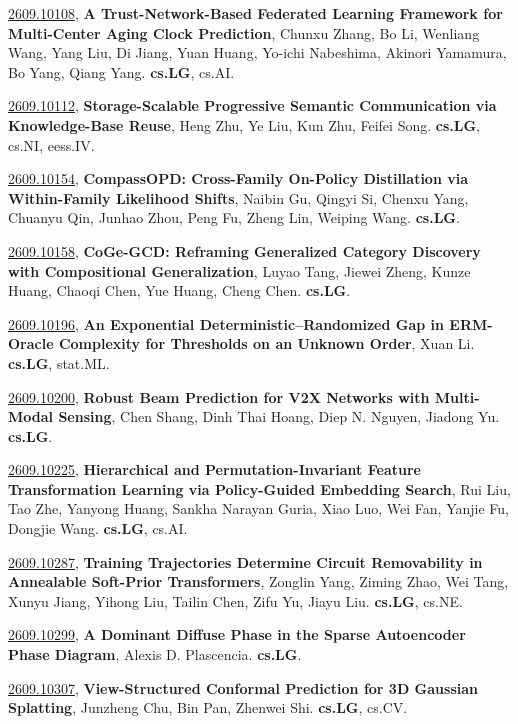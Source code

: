 \documentclass[9pt, a4paper]{article}
\theoremstyle{plain}
\theoremstyle{definition}
\theoremstyle{remark}
\newcommand{\arxivwithtarget}[3]{\hypertarget{#1}{}\href{https://arxiv.org/abs/#1}{#1}, \textbf{\textcolor{arxivblue}{#2}}, #3. }
\begin{document}
\arxivwithtarget{2609.10108}{A Trust-Network-Based Federated Learning Framework for Multi-Center Aging Clock Prediction}{Chunxu Zhang, Bo Li, Wenliang Wang, Yang Liu, Di Jiang, Yuan Huang, Yo-ichi Nabeshima, Akinori Yamamura, Bo Yang, Qiang Yang}\textbf{cs.LG}, cs.AI.



\arxivwithtarget{2609.10112}{Storage-Scalable Progressive Semantic Communication via Knowledge-Base Reuse}{Heng Zhu, Ye Liu, Kun Zhu, Feifei Song}\textbf{cs.LG}, cs.NI, eess.IV.



\arxivwithtarget{2609.10154}{CompassOPD: Cross-Family On-Policy Distillation via Within-Family Likelihood Shifts}{Naibin Gu, Qingyi Si, Chenxu Yang, Chuanyu Qin, Junhao Zhou, Peng Fu, Zheng Lin, Weiping Wang}\textbf{cs.LG}.



\arxivwithtarget{2609.10158}{CoGe-GCD: Reframing Generalized Category Discovery with Compositional Generalization}{Luyao Tang, Jiewei Zheng, Kunze Huang, Chaoqi Chen, Yue Huang, Cheng Chen}\textbf{cs.LG}.



\arxivwithtarget{2609.10196}{An Exponential Deterministic--Randomized Gap in ERM-Oracle Complexity for Thresholds on an Unknown Order}{Xuan Li}\textbf{cs.LG}, stat.ML.



\arxivwithtarget{2609.10200}{Robust Beam Prediction for V2X Networks with Multi-Modal Sensing}{Chen Shang, Dinh Thai Hoang, Diep N. Nguyen, Jiadong Yu}\textbf{cs.LG}.



\arxivwithtarget{2609.10225}{Hierarchical and Permutation-Invariant Feature Transformation Learning via Policy-Guided Embedding Search}{Rui Liu, Tao Zhe, Yanyong Huang, Sankha Narayan Guria, Xiao Luo, Wei Fan, Yanjie Fu, Dongjie Wang}\textbf{cs.LG}, cs.AI.



\arxivwithtarget{2609.10287}{Training Trajectories Determine Circuit Removability in Annealable Soft-Prior Transformers}{Zonglin Yang, Ziming Zhao, Wei Tang, Xunyu Jiang, Yihong Liu, Tailin Chen, Zifu Yu, Jiayu Liu}\textbf{cs.LG}, cs.NE.



\arxivwithtarget{2609.10299}{A Dominant Diffuse Phase in the Sparse Autoencoder Phase Diagram}{Alexis D. Plascencia}\textbf{cs.LG}.



\arxivwithtarget{2609.10307}{View-Structured Conformal Prediction for 3D Gaussian Splatting}{Junzheng Chu, Bin Pan, Zhenwei Shi}\textbf{cs.LG}, cs.CV.
\end{document}
